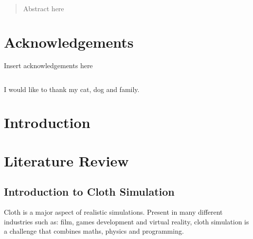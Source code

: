 \documentclass[12pt,a4paper]{article}
\begin{document}
	

	



\pagebreak

\pagebreak

\begin{abstract}
Abstract here
\end{abstract}
\pagebreak

\tableofcontents %
\newpage

\listoftables
\newpage

\listoffigures
\newpage

\section*{Acknowledgements}
Insert acknowledgements here
\subsection*{}
	I would like to thank my cat, dog and family.
\newpage

\section{Introduction}
\newpage
\section{Literature Review}
\subsection{Introduction to Cloth Simulation}
Cloth is a major aspect of realistic simulations. Present in many different industries such as: film, games development and virtual reality, cloth simulation is a challenge that combines maths, physics and programming. \\
\end{document}
